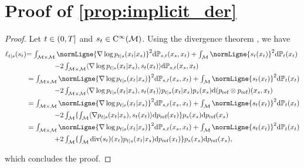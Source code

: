 \section{Proof of \cref{prop:implicit_der}}
\label{sec:implicit-losses}



\begin{proof}
      Let $t \in \left(0,T\right]$ and $s_t \in \mathrm{C}^\infty(\mathcal M)$. Using the
      divergence theorem \cite[see][p.51]{lee2018introduction}, we have
      \begin{align}
        \ell_{t|s}(s_t) &\textstyle{= \int_{\M \times \M} \normLigne{\nabla \log p_{t|s}(x_t|x_s)}^2 \rmd \Pbb_{s,t}(x_s,x_t) + \int_\M \normLigne{s_t(x_t)}^2 \rmd \Pbb_{t}(x_t)} \\
        & \qquad \qquad \textstyle{- 2 \int_{\M \times \M} \langle \nabla \log p_{t|s}(x_t|x_s), s_t(x_t) \rangle \rmd \Pbb_{s,t}(x_s,x_t)} \\
                    &=\textstyle{\int_{\M \times \M} \normLigne{\nabla \log p_{t|s}(x_t|x_s)}^2 \rmd \Pbb_{s,t}(x_s,x_t) + \int_\M \normLigne{s_t(x_t)}^2 \rmd \Pbb_{t}(x_t)} \\
                    & \qquad \qquad \textstyle{- 2 \int_{\M \times \M}  \langle \nabla \log p_{t|s}(x_t|x_s), s_t(x_t) \rangle p_{t|s}(x_t|x_s)p_s(x_s) \rmd (\piinv \otimes \piinv) (x_s, x_t)  } \\
        &=\textstyle{\int_{\M \times \M} \normLigne{\nabla \log p_{t|s}(x_t|x_s)}^2 \rmd \Pbb_{s,t}(x_s,x_t) + \int_\M \normLigne{s_t(x_t)}^2 \rmd \Pbb_{t}(x_t)} \\
                    & \qquad \qquad \textstyle{- 2 \int_{\M } \{\int_\M  \langle \nabla p_{t|s}(x_t|x_s), s_t(x_t) \rangle \rmd \piinv(x_t)\} p_s(x_s) \rmd \piinv(x_s)  } \\
        &=\textstyle{\int_{\M \times \M} \normLigne{\nabla \log p_{t|s}(x_t|x_s)}^2 \rmd \Pbb_{s,t}(x_s,x_t) + \int_\M \normLigne{s_t(x_t)}^2 \rmd \Pbb_{t}(x_t)} \\
                    & \qquad \qquad \textstyle{ +2 \int_{\M } \{\int_\M   \dive(s_t)(x_t)p_{t|s}(x_t|x_s)  \rmd \piinv(x_t)\} p_s(x_s) \rmd \piinv(x_s)  }  ,
      \end{align}


      which concludes the proof.
    \end{proof}

